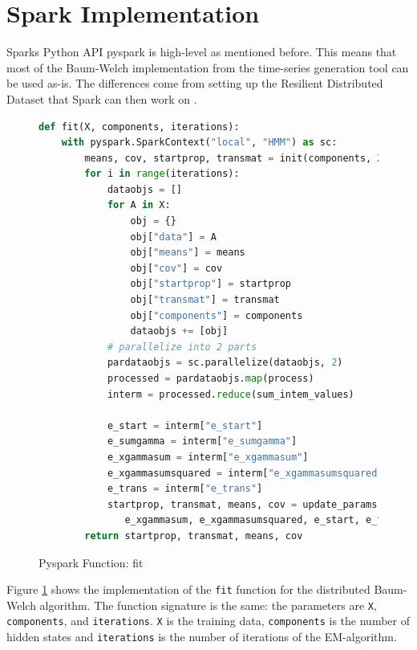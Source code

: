 \section{Spark Implementation}

Sparks Python API pyspark is high-level as mentioned before. This means that most of the Baum-Welch implementation from the time-series generation tool can be used as-is. The differences come from setting up the Resilient Distributed Dataset that Spark can then work on \parencite{sparkhmm}.

\begin{figure}
\begin{singlespace}
\begin{lstlisting}[language=Python]
def fit(X, components, iterations):
    with pyspark.SparkContext("local", "HMM") as sc:
        means, cov, startprop, transmat = init(components, X)
        for i in range(iterations):
            dataobjs = []
            for A in X:
                obj = {}
                obj["data"] = A
                obj["means"] = means
                obj["cov"] = cov
                obj["startprop"] = startprop
                obj["transmat"] = transmat
                obj["components"] = components
                dataobjs += [obj]
            # parallelize into 2 parts
            pardataobjs = sc.parallelize(dataobjs, 2)
            processed = pardataobjs.map(process)
            interm = processed.reduce(sum_intem_values)

            e_start = interm["e_start"]
            e_sumgamma = interm["e_sumgamma"]
            e_xgammasum = interm["e_xgammasum"]
            e_xgammasumsquared = interm["e_xgammasumsquared"]
            e_trans = interm["e_trans"]
            startprop, transmat, means, cov = update_params(e_sumgamma, \
               e_xgammasum, e_xgammasumsquared, e_start, e_trans)
        return startprop, transmat, means, cov
\end{lstlisting}
\end{singlespace}
\caption{Pyspark Function: fit}    
\label{fig:pyspark-fit-listing}
\end{figure}

Figure \ref{fig:pyspark-fit-listing} shows the implementation of the \texttt{fit} function for the distributed Baum-Welch algorithm. The function signature is the same: the parameters are \texttt{X}, \texttt{components}, and \texttt{iterations}. \texttt{X} is the training data, \texttt{components} is the number of hidden states and \texttt{iterations} is the number of iterations of the EM-algorithm. 

